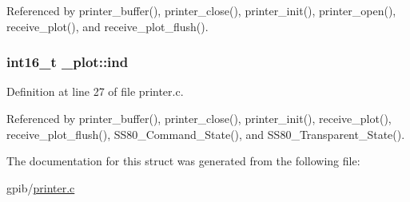 Referenced by printer\+\_\+buffer(), printer\+\_\+close(), printer\+\_\+init(), printer\+\_\+open(), receive\+\_\+plot(), and receive\+\_\+plot\+\_\+flush().

\subsubsection[{\texorpdfstring{ind}{ind}}]{\setlength{\rightskip}{0pt plus 5cm}int16\+\_\+t \+\_\+plot\+::ind}\hypertarget{struct__plot_ab02a041a2c701b09447d883089abba4f}{}\label{struct__plot_ab02a041a2c701b09447d883089abba4f}


Definition at line 27 of file printer.\+c.



Referenced by printer\+\_\+buffer(), printer\+\_\+close(), printer\+\_\+init(), receive\+\_\+plot(), receive\+\_\+plot\+\_\+flush(), S\+S80\+\_\+\+Command\+\_\+\+State(), and S\+S80\+\_\+\+Transparent\+\_\+\+State().



The documentation for this struct was generated from the following file\+:\begin{DoxyCompactItemize}
\item 
gpib/\hyperlink{printer_8c}{printer.\+c}\end{DoxyCompactItemize}
